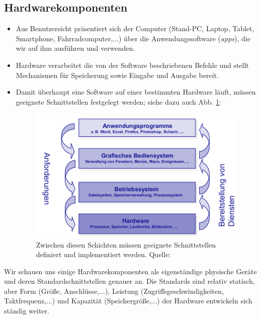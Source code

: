 \subsection{Hardwarekomponenten}
\begin{itemize}
	\item Aus Benutzersicht präsentiert sich der Computer (Stand-PC, Laptop, Tablet, Smartphone, Fahrradcomputer,...) über die Anwendungssoftware (\textit{apps}), die wir auf ihm ausführen und verwenden.
	\item Hardware verarbeitet die von der Software beschriebenen Befehle und stellt Mechanismen für Speicherung sowie Eingabe und Ausgabe bereit.
	\item Damit überhaupt eine Software auf einer bestimmten Hardware läuft, müssen geeignete Schnittstellen festgelegt werden; siehe dazu auch Abb. \ref{fig:betriebssystem}:
	\begin{figure}[h!]
		\centering
		\includegraphics[width=0.5\linewidth]{./media/betriebssystem}
		\caption[Schnittstellen]{Zwischen diesen Schichten müssen geeignete Schnittstellen definiert und implementiert werden. Quelle: \cite[Abb. 1.25]{gumm2}}
		\label{fig:betriebssystem}
	\end{figure}
\end{itemize}
%
Wir schauen uns einige Hardwarekomponenten als eigenständige physische Geräte und deren Standardschnittstellen genauer an. Die Standards sind relativ statisch, aber Form (Größe, Anschlüsse,...), Leistung (Zugriffsgeschwindigkeiten, Taktfrequenz,...) und Kapazität (Speichergröße,...) der Hardware entwickeln sich ständig weiter.

